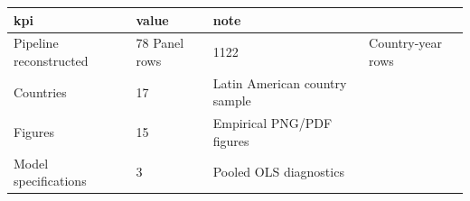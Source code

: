 ﻿%
\begin{tabular}{lll}
\hline
kpi & value & note \\
\hline
Pipeline reconstructed & 78%
Panel rows & 1122 & Country-year rows \\
Countries & 17 & Latin American country sample \\
Figures & 15 & Empirical PNG/PDF figures \\
Model specifications & 3 & Pooled OLS diagnostics \\
\hline
\end{tabular}

